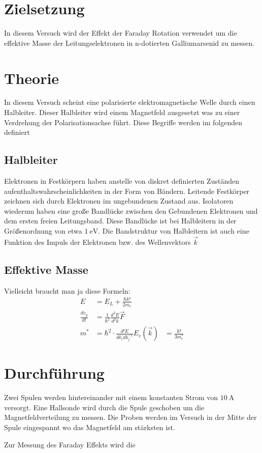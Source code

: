 \section{Zielsetzung}
In diesem Versuch wird der Effekt der Faraday Rotation verwendet um die
effektive Masse der Leitungselektronen in n-dotierten Galliumarsenid zu messen.

\section{Theorie}
In diesem Versuch scheint eine polarisierte elektromagnetische Welle durch
einen Halbleiter. Dieser Halbleiter wird einem Magnetfeld ausgesetzt was zu
einer Verdrehung der Polarisationsachse führt. Diese Begriffe werden im
folgenden definiert

\subsection{Halbleiter \cite[][Kap. 14]{book:expi3}}
Elektronen in Festkörpern haben anstelle von diskret definierten Zuständen
aufenthaltswahrscheinlichkeiten in der Form von Bändern. Leitende Festkörper
zeichnen sich durch Elektronen im ungebundenen Zustand aus. Isolatoren wiederum
haben eine große Bandlücke zwischen den Gebundenen Elektronen und dem ersten
freien Leitungsband. Diese Bandlücke ist bei Halbleitern in der Größenordnung
von etwa $\qty{1}{\eV}$. Die Bandstruktur von Halbleitern ist auch eine Funktion
des Impuls der Elektronen bzw. des Wellenvektors $\vec{k}$

\subsection{Effektive Masse}

Vielleicht braucht man ja diese Formeln:
\begin{align}
	E                 & = E_L + \frac{\hbar k²}{2 m_e}                 \\
	\frac{d v_g}{d t} & = \frac{1}{\hbar^2}\frac{d^2 E}{d^2 k} \vec{F} \\
	m^*               & = \hbar^2 \cdot \frac{d²E}{d k_i d k_j^{-1}}
	E_e(\vec{k})	& = \frac{\hbar²}{3m^*_e}
\end{align}

\section{Durchführung\cite{man}}%
Zwei Spulen werden hintereinander mit einem konstanten Strom von
$\qty{10}{\ampere}$ versorgt. Eine Hallsonde wird durch die Spule geschoben um
die Magnetfeldverteilung zu messen. Die Proben werden im Versuch in der 
Mitte der Spule eingespannt wo das Magnetfeld am stärksten ist.

Zur Messung des Faraday Effekts wird die 